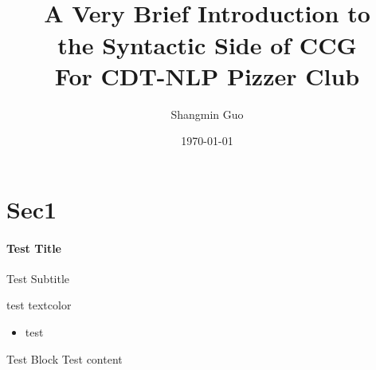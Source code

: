 \documentclass[mathserif,xcolor=dvipsnames,svgnames,aspectratio=43]{beamer}
\begin{document}
\title{\\\medskip \LARGE{A Very Brief Introduction to \\ the Syntactic Side of CCG} %
    \\\medskip
    \Large\textcolor{beautyblue}{For CDT-NLP Pizzer Club}}
    
\author{\large{Shangmin Guo}}
\date[someday\ldots]{\today} %

\begin{frame}
    \titlepage
\end{frame}

\section{Sec1}

\begin{frame}[t]
    \framesubtitle{Test Title}{Test Subtitle}

    test textcolor

    \begin{itemize}
        \item test
    \end{itemize}

    \begin{block}{Test Block}
        Test content
    \end{block}

\end{frame}
\end{document}
